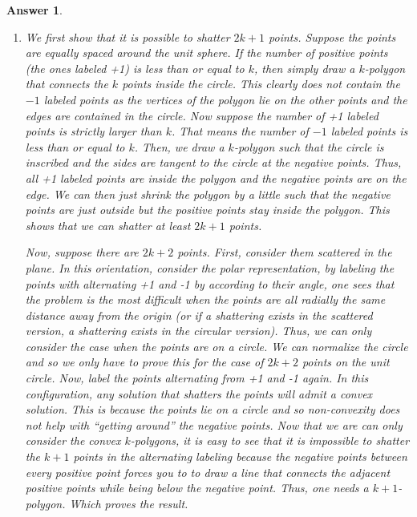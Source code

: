 \documentclass[12pt]{article}
\theoremstyle{colon}
\newtheorem*{answer}{Answer}
\begin{document}
\begin{answer}
  \leavevmode
  \begin{enumerate}[label=\arabic*)]
    \item We first show that it is possible to shatter $2k+1$ points. Suppose the points are equally spaced around the unit sphere. If the number of positive points (the ones labeled +1) is less than or equal to $k$, then simply draw a $k$-polygon that connects the $k$ points inside the circle. This clearly does not contain the $-1$ labeled points as the vertices of the polygon lie on the other points and the edges are contained in the circle. Now suppose the number of +1 labeled points is strictly larger than $k$. That means the number of $-1$ labeled points is less than or equal to $k$. Then, we draw a $k$-polygon such that the circle is inscribed and the sides are tangent to the circle at the negative points. Thus, all +1 labeled points are inside the polygon and the negative points are on the edge. We can then just shrink the polygon by a little such that the negative points are just outside but the positive points stay inside the polygon. This shows that we can shatter at least $2k+1$ points.

    Now, suppose there are $2k+2$ points. First, consider them scattered in the plane. In this orientation, consider the polar representation, by labeling the points with alternating +1 and -1 by according to their angle, one sees that the problem is the most difficult when the points are all radially the same distance away from the origin (or if a shattering exists in the scattered version, a shattering exists in the circular version). Thus, we can only consider the case when the points are on a circle. We can normalize the circle and so we only have to prove this for the case of $2k+2$ points on the unit circle. Now, label the points alternating from +1 and -1 again. In this configuration, any solution that shatters the points will admit a convex solution. This is because the points lie on a circle and so non-convexity does not help with ``getting around'' the negative points. Now that we are can only consider the convex $k$-polygons, it is easy to see that it is impossible to shatter the $k+1$ points in the alternating labeling because the negative points between every positive point forces you to to draw a line that connects the adjacent positive points while being below the negative point. Thus, one needs a $k+1$-polygon. Which proves the result.


\end{enumerate}
\end{answer}
\end{document}
